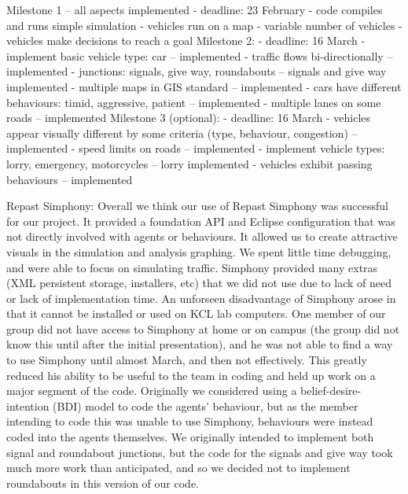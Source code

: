 \documentclass[11pt]{article}
\begin{document}
Milestone 1 – all aspects implemented
- deadline: 23 February 
- code compiles and runs simple simulation
- vehicles run on a map
- variable number of vehicles
- vehicles make decisions to reach a goal
Milestone 2:
- deadline: 16 March
- implement basic vehicle type: car – implemented 
- traffic flows bi-directionally – implemented 
- junctions: signals, give way, roundabouts – signals and give way implemented
- multiple maps in GIS standard – implemented 
- cars have different behaviours: timid, aggressive, patient – implemented
- multiple lanes on some roads – implemented 
Milestone 3 (optional):
- deadline: 16 March 
- vehicles appear visually different by some criteria (type, behaviour, congestion) – implemented
- speed limits on roads – implemented 
- implement vehicle types: lorry, emergency, motorcycles – lorry implemented
- vehicles exhibit passing behaviours – implemented

Repast Simphony:
Overall we think our use of Repast Simphony was successful for our project. It provided a foundation API and Eclipse configuration that was not directly involved with agents or behaviours. It allowed us to create attractive visuals in the simulation and analysis graphing. We spent little time debugging, and were able to focus on simulating traffic. Simphony provided many extras (XML persistent storage, installers, etc) that we did not use due to lack of need or lack of implementation time.
An unforseen disadvantage of Simphony arose in that it cannot be installed or used on KCL lab computers. One member of our group did not have access to Simphony at home or on campus (the group did not know this until after the initial presentation), and he was not able to find a way to use Simphony until almost March, and then not effectively. This greatly reduced his ability to be useful to the team in coding and held up work on a major segment of the code.
Originally we considered using a belief-desire-intention (BDI) model to code the agents’ behaviour, but as the member intending to code this was unable to use Simphony, behaviours were instead coded into the agents themselves.
We originally intended to implement both signal and roundabout junctions, but the code for the signals and give way took much more work than anticipated, and so we decided not to implement roundabouts in this version of our code.
\end{document}
